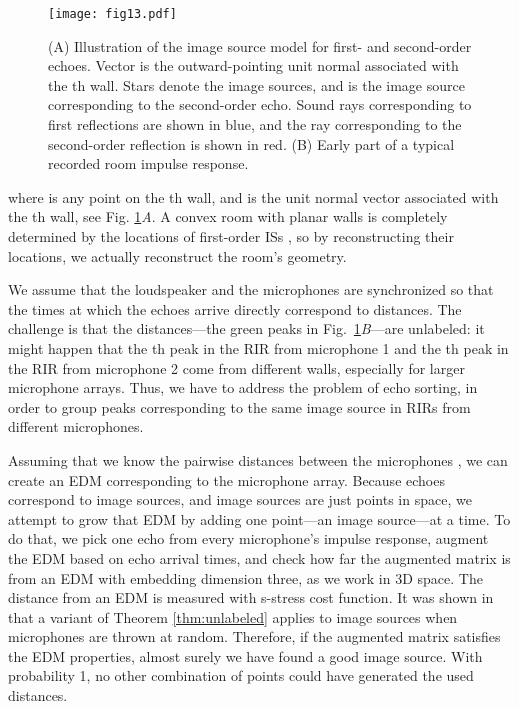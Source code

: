\documentclass[10pt,double]{IEEEtran}
\begin{document}
\begin{figure}[t]
\centering
\texttt{[image: fig13.pdf]}
\caption{(A) Illustration of the image source model for first- and second-order
echoes. Vector  is the outward-pointing unit normal associated with the
th wall. Stars denote the image sources, and  is the image
source corresponding to the second-order echo. Sound rays corresponding to
first reflections are shown in blue, and the ray corresponding to the
second-order reflection is shown in red. (B) Early part of a typical recorded
room impulse response.}
\label{fig:room_hearing_is}
\end{figure}


where  is any point on the th wall, and  is the unit normal
vector associated with the th wall, see Fig.
\ref{fig:room_hearing_is}\textsl{A}.
A convex room with planar walls is completely determined by the locations of
first-order ISs \cite{Dokmanic:2013dz}, so by reconstructing their locations,
we actually reconstruct the room's geometry.

We assume that the loudspeaker and the microphones are synchronized so that
the times at which the echoes arrive directly correspond to distances. The
challenge is that the distances---the green peaks in
Fig.~\ref{fig:room_hearing_is}\textsl{B}---are unlabeled: it might happen that
the th peak in the RIR from microphone 1 and the th peak in the RIR from
microphone 2 come from different walls, especially for larger microphone
arrays. Thus, we have to address the problem of echo sorting, in order to
group peaks corresponding to the same image source in RIRs from different
microphones.

Assuming that we know the pairwise distances between the microphones , we can create an EDM corresponding to the microphone
array. Because echoes correspond to image sources, and image sources are just
points in space, we attempt to grow that EDM by adding one point---an image
source---at a time. To do that, we pick one echo from every microphone's
impulse response, augment the EDM based on echo arrival times, and check how
far the augmented matrix is from an EDM with embedding dimension three, as we
work in 3D space. The distance from an EDM is measured with s-stress cost
function. It was shown in \cite{Dokmanic:2013dz} that a variant of Theorem
\ref{thm:unlabeled} applies to image sources when microphones are thrown at
random. Therefore, if the augmented matrix satisfies the EDM properties,
almost surely we have found a good image source. With probability 1, no
other combination of points could have generated the used distances.
\end{document}
